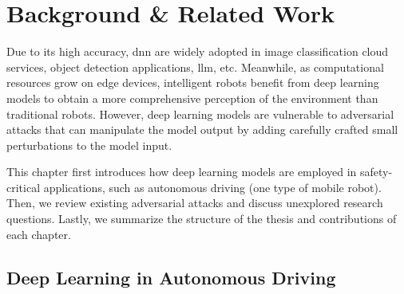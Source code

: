 \chapter{Background \& Related Work}
\label{chpt:intro}

Due to its high accuracy, \acrfull{dnn} are widely adopted in image classification cloud services, object detection applications, \acrfull{llm}, etc. Meanwhile, as computational resources grow on edge devices, intelligent robots benefit from deep learning models to obtain a more comprehensive perception of the environment than traditional robots. However, deep learning models are vulnerable to adversarial attacks that can manipulate the model output by adding carefully crafted small perturbations to the model input.

This chapter first introduces how deep learning models are employed in safety-critical applications, such as autonomous driving (one type of mobile robot). Then, we review existing adversarial attacks and discuss unexplored research questions. Lastly, we summarize the structure of the thesis and contributions of each chapter.


\section{Deep Learning in Autonomous Driving}
\label{sec:deep_learning}


